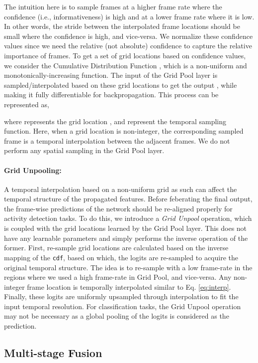 \documentclass[final]{cvpr}
\begin{document}
The intuition here is to sample frames at a higher frame rate where the confidence (i.e., informativeness) is high and at a lower frame rate where it is low. In other words, the stride between the interpolated frame locations should be small where the confidence is high, and vice-versa. We normalize these confidence values  since we need the relative (not absolute) confidence to capture the relative importance of frames. To get a set of  grid locations based on confidence values, we consider the Cumulative Distribution Function , which is a non-uniform and monotonically-increasing function. The input of the Grid Pool layer  is sampled/interpolated based on these grid locations to get the output , while making it fully differentiable for backpropagation. This process can be represented as,
\setlength{\jot}{3pt}

where  represents the grid location , and  represent the temporal sampling function. Here, when a grid location is non-integer, the corresponding sampled frame is a temporal interpolation between the adjacent frames. We do not perform any spatial sampling in the Grid Pool layer.

\paragraph{Grid Unpooling:}
A temporal interpolation based on a non-uniform grid as such can affect the temporal structure of the propagated features.
Before feberating the final output, the frame-wise predictions of the network should be re-aligned properly for activity detection tasks. To do this, we introduce a \textit{Grid Unpool} operation, which is coupled with the grid locations learned by the Grid Pool layer. This does not have any learnable parameters and simply performs the inverse operation of the former. First,  re-sample grid locations are calculated based on the inverse mapping of the \texttt{cdf}, based on which, the logits are re-sampled to acquire the original temporal structure. The idea is to re-sample with a low frame-rate in the regions where we used a high frame-rate in Grid Pool, and vice-versa. Any non-integer frame location is temporally interpolated similar to Eq. \ref{eq:interp}. Finally, these logits are uniformly upsampled through interpolation to fit the input temporal resolution. For classification tasks, the Grid Unpool operation may not be necessary as a global pooling of the logits is considered as the prediction.

\subsection{Multi-stage Fusion}
\label{subsec:fusion}
\end{document}
